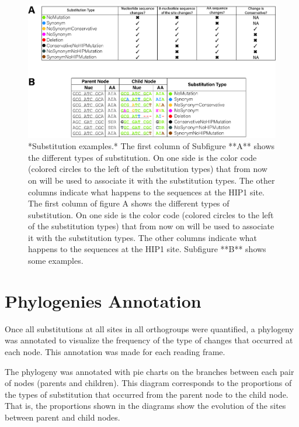 \documentclass[
]{book}
\begin{document}
\begin{figure}

{\centering \includegraphics[width=1\linewidth]{figures/4x/table1} 

}

\caption{*Substitution examples.* The first column of Subfigure **A** shows the different types of substitution. On one side is the color code (colored circles to the left of the substitution types) that from now on will be used to associate it with the substitution types. The other columns indicate what happens to the sequences at the HIP1 site. The first column of figure A shows the different types of substitution. On one side is the color code (colored circles to the left of the substitution types) that from now on will be used to associate it with the substitution types. The other columns indicate what happens to the sequences at the HIP1 site. Subfigure **B** shows some examples. }\label{fig:FIG4x}
\end{figure}

\hypertarget{phylogenies-annotation}{%
\section{Phylogenies Annotation}\label{phylogenies-annotation}}

Once all substitutions at all sites in all orthogroups were quantified, a phylogeny was annotated to visualize the frequency of the type of changes that occurred at each node. This annotation was made for each reading frame.

The phylogeny was annotated with pie charts on the branches between each pair of nodes (parents and children). This diagram corresponds to the proportions of the types of substitution that occurred from the parent node to the child node. That is, the proportions shown in the diagrams show the evolution of the sites between parent and child nodes.
\end{document}
